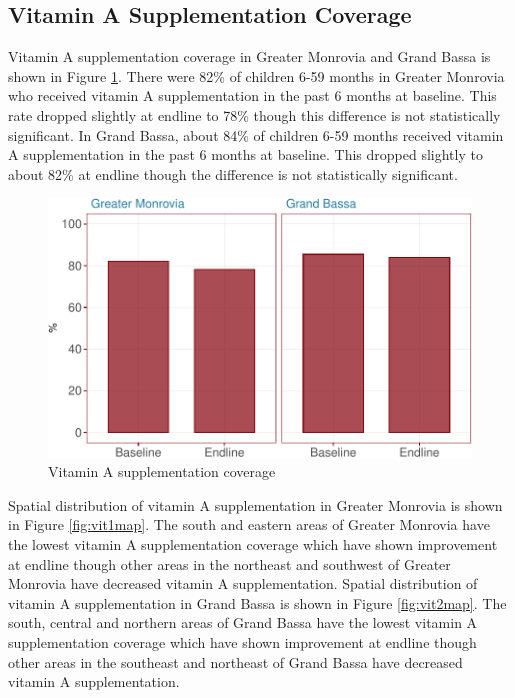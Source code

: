 \documentclass[12pt,a4paper]{article}
\begin{document}
\hypertarget{vitamin-a-supplementation-coverage}{%
\subsection{Vitamin A Supplementation Coverage}\label{vitamin-a-supplementation-coverage}}

Vitamin A supplementation coverage in Greater Monrovia and Grand Bassa is shown in Figure \ref{fig:vit1plot}. There were 82\% of children 6-59 months in Greater Monrovia who received vitamin A supplementation in the past 6 months at baseline. This rate dropped slightly at endline to 78\% though this difference is not statistically significant. In Grand Bassa, about 84\% of children 6-59 months received vitamin A supplementation in the past 6 months at baseline. This dropped slightly to about 82\% at endline though the difference is not statistically significant.

\begin{figure}[H]

{\centering \includegraphics{liberiaCoverageFinalReport_files/figure-latex/vit1plot-1} 

}

\caption{Vitamin A supplementation coverage}\label{fig:vit1plot}
\end{figure}

Spatial distribution of vitamin A supplementation in Greater Monrovia is shown in Figure \ref{fig:vit1map}. The south and eastern areas of Greater Monrovia have the lowest vitamin A supplementation coverage which have shown improvement at endline though other areas in the northeast and southwest of Greater Monrovia have decreased vitamin A supplementation. Spatial distribution of vitamin A supplementation in Grand Bassa is shown in Figure \ref{fig:vit2map}. The south, central and northern areas of Grand Bassa have the lowest vitamin A supplementation coverage which have shown improvement at endline though other areas in the southeast and northeast of Grand Bassa have decreased vitamin A supplementation.
\end{document}

